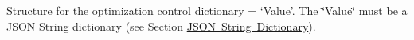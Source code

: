 Structure for the optimization control dictionary = `Value'. The \char`\"{}\+Value\char`\"{} must be a JSON String dictionary (see Section \mbox{\hyperlink{feaDesignConstraint_jsonStringDesignConstraint}{JSON String Dictionary}}).